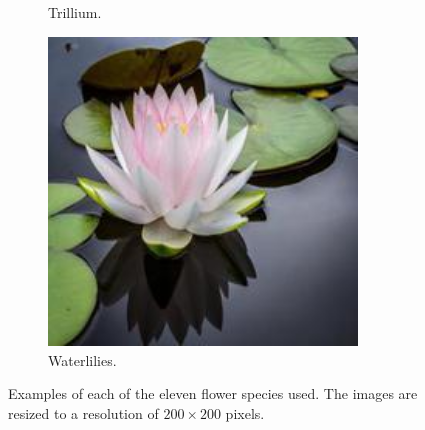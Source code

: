 \begin{figure}
\begin{subfigure}{0.24\textwidth}
        \caption{Trillium.}
    \end{subfigure}
    \begin{subfigure}{0.24\textwidth}
        \centering
        \includegraphics[width=0.9\textwidth]{../example_images/Waterlilies.jpg}
        \caption{Waterlilies.}
    \end{subfigure}
    \caption{Examples of each of the eleven flower species used. The images are resized to a resolution of $200\times200$ pixels.}
    \label{fig:images}
\end{figure}